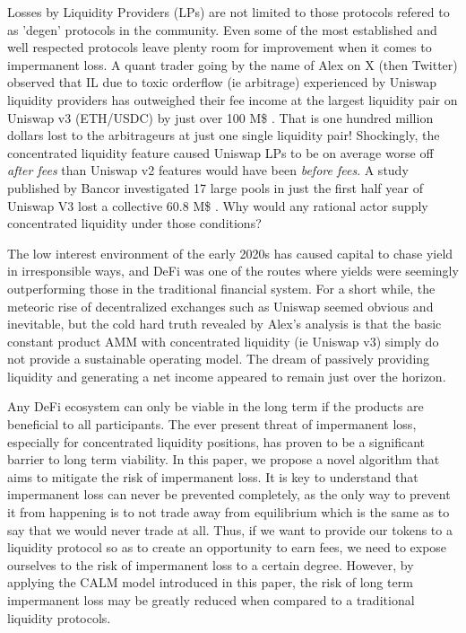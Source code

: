 \documentclass [10pt, twoside] {article}
\begin{document}
Losses by Liquidity Providers (LPs) are not limited to those protocols refered to as 'degen' protocols in the community. Even some of the most established and well respected protocols leave plenty room for improvement when it comes to impermanent loss. A quant trader going by the name of Alex on X (then Twitter) observed that IL due to toxic orderflow (ie arbitrage) experienced by Uniswap liquidity providers has outweighed their fee income at the largest liquidity pair on Uniswap v3 (ETH/USDC) by just over 100 M\$ \cite{alex, dune}. That is one hundred million dollars lost to the arbitrageurs at just one single liquidity pair! Shockingly, the concentrated liquidity feature caused Uniswap LPs to be on average worse off \emph{after fees} than Uniswap v2 features would have been \emph{before fees}. A study published by Bancor investigated 17 large pools in just the first half year of Uniswap V3 lost a collective 60.8 M\$ \cite{bancorIL}. Why would any rational actor supply concentrated liquidity under those conditions?

The low interest environment of the early 2020s has caused capital to chase yield in irresponsible ways, and DeFi was one of the routes where yields were seemingly outperforming those in the traditional financial system. For a short while, the meteoric rise of decentralized exchanges such as Uniswap seemed obvious and inevitable, but the cold hard truth revealed by Alex's analysis is that the basic constant product AMM with concentrated liquidity (ie Uniswap v3) simply do not provide a sustainable operating model. The dream of passively providing liquidity and generating a net income appeared to remain just over the horizon.

Any DeFi ecosystem can only be viable in the long term if the products are beneficial to all participants. The ever present threat of impermanent loss, especially for concentrated liquidity positions, has proven to be a significant barrier to long term viability. In this paper, we propose a novel algorithm that aims to mitigate the risk of impermanent loss. It is key to understand that impermanent loss can never be prevented completely, as the only way to prevent it from happening is to not trade away from equilibrium which is the same as to say that we would never trade at all. Thus, if we want to provide our tokens to a liquidity protocol so as to create an opportunity to earn fees, we need to expose ourselves to the risk of impermanent loss to a certain degree. However, by applying the CALM model introduced in this paper, the risk of long term impermanent loss may be greatly reduced when compared to a traditional liquidity protocols.
\end{document}
